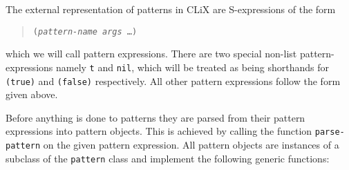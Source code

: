 \documentclass[a4paper,11pt]{scrartcl}
\begin{document}
The external representation of patterns in CLiX are S-expressions of
the form

\begin{quotation}
  \texttt{(\textsl{pattern-name} \textsl{args} \dots)}
\end{quotation}

which we will call pattern expressions.  There are two special
non-list pattern-expressions namely \texttt{t} and \texttt{nil}, which
will be treated as being shorthands for \texttt{(true)} and
\texttt{(false)} respectively.  All other pattern expressions follow
the form given above.

Before anything is done to patterns they are parsed from their pattern
expressions into pattern objects.  This is achieved by calling the
function \texttt{parse-pattern} on the given pattern expression.  All
pattern objects are instances of a subclass of the \texttt{pattern}
class and implement the following generic functions:
\end{document}
